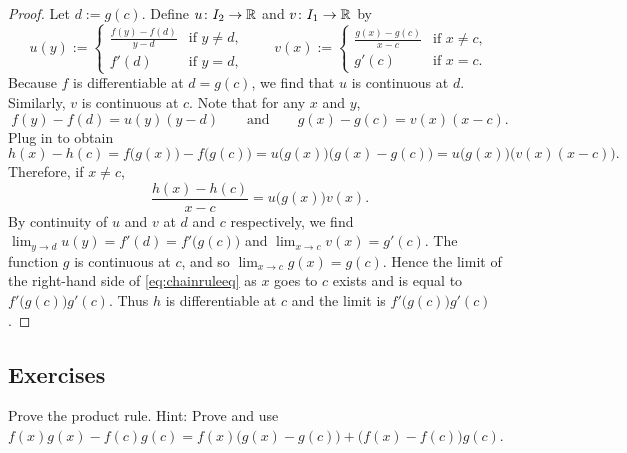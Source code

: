 \begin{proof}
Let $d := g(c)$.  Define
$u \colon I_2 \to {\mathbb{R}}$ and $v \colon I_1 \to {\mathbb{R}}$ by
\begin{equation*}
u(y) :=
\begin{cases}
 \frac{f(y) - f(d)}{y-d}  & \text{if } y \not=d, \\
 f'(d)                    & \text{if } y = d,
\end{cases}
\qquad
v(x) :=
\begin{cases}
 \frac{g(x) - g(c)}{x-c} & \text{if } x \not=c, \\
 g'(c)                   & \text{if } x = c.
\end{cases}
\end{equation*}
Because $f$ is differentiable at $d = g(c)$, we find that
$u$ is continuous at $d$.  Similarly, $v$ is continuous at $c$.
Note that for any $x$ and $y$,
\begin{equation*}
f(y)-f(d) = u(y) (y-d)
\qquad \text{and} \qquad
g(x)-g(c) = v(x) (x-c) .
\end{equation*}
Plug in to obtain
\begin{equation*}
h(x)-h(c)
=
f\bigl(g(x)\bigr)-f\bigl(g(c)\bigr)
=
u\bigl( g(x) \bigr) \bigl(g(x)-g(c)\bigr)
=
u\bigl( g(x) \bigr) \bigl(v(x) (x-c)\bigr) .
\end{equation*}
Therefore, if $x \not= c$,
\begin{equation} \label{eq:chainruleeq}
\frac{h(x)-h(c)}{x-c}
=
u\bigl( g(x) \bigr) v(x) .
\end{equation}
By continuity of $u$ and $v$ at $d$ and $c$ respectively, we find
$\lim_{y \to d} u(y)
= f'(d) = f'\bigl(g(c)\bigr)$ and
$\lim_{x \to c} v(x) = g'(c)$.
The function $g$ is continuous at $c$, and so $\lim_{x \to c} g(x) = g(c)$.
Hence the limit of
the right-hand side of \eqref{eq:chainruleeq}
as $x$ goes to $c$
exists and is equal to $f'\bigl(g(c)\bigr) g'(c)$.  Thus $h$
is differentiable at $c$ and the limit is $f'\bigl(g(c)\bigr)g'(c)$.
\end{proof}

\subsection{Exercises}

\begin{exercise}
Prove the product rule.
Hint: Prove and use
$f(x) g(x) - f(c) g(c) = f(x)\bigl( g(x) - g(c) \bigr) + \bigl( f(x) -
f(c) \bigr) g(c)$.
\end{exercise}

